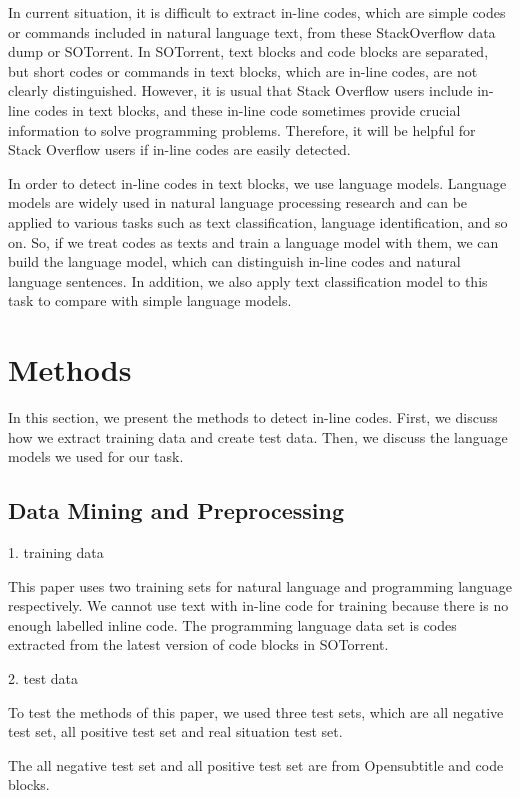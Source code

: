 \documentclass[conference]{IEEEtran}
\begin{document}
In current situation, it is difficult to extract in-line codes, which are simple codes or commands included in natural language text, from these StackOverflow data dump or SOTorrent. In SOTorrent, text blocks and code blocks are separated, but short codes or commands in text blocks, which are in-line codes, are not clearly distinguished. However, it is usual that Stack Overflow users include in-line codes in text blocks, and these in-line code sometimes provide crucial information to solve programming problems. Therefore, it will be helpful for Stack Overflow users if in-line codes are easily detected. 

In order to detect in-line codes in text blocks, we use language models. Language models are widely used in natural language processing research and can be applied to various tasks such as text classification, language identification, and so on. So, if we treat codes as texts and train a language model with them, we can build the language model, which can distinguish in-line codes and natural language sentences. In addition, we also apply text classification model to this task to compare with simple language models.


\section{Methods}
In this section, we present the methods to detect in-line codes. First, we discuss how we extract training data and create test data. Then, we discuss the language models we used for our task.

\subsection{Data Mining and Preprocessing}
1.	training data

This paper uses two training sets for natural language and programming language respectively. We cannot use text with in-line code for training because there is no enough labelled inline code. The programming language data set is codes extracted from the latest version of code blocks in SOTorrent. 

2.	test data

To test the methods of this paper, we used three test sets, which are all negative test set, all positive test set and real situation test set.

The all negative test set and all positive test set are from Opensubtitle and code blocks. 
\end{document}
